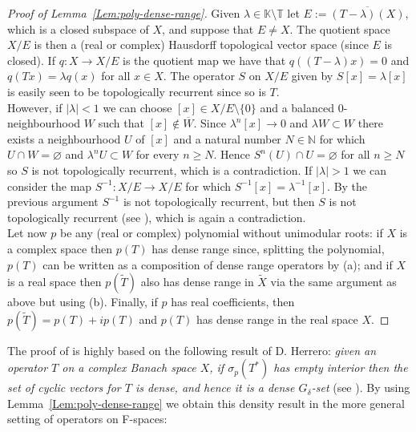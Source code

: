 \documentclass[openright,11pt]{article}
\theoremstyle{plain}
\theoremstyle{definition}
\newcommand{\NN}{\mathbb{N}}
\newcommand{\KK}{\mathbb{K}}
\newcommand{\TT}{\mathbb{T}}
\newcommand{\cl}{\overline}
\newcommand{\til}{\widetilde} %
\begin{document}
\begin{proof}[Proof of Lemma~\ref{Lem:poly-dense-range}]
	Given $\lambda \in \KK\setminus\TT$ let $E:=\cl{(T-\lambda)(X)}$, which is a closed subspace of $X$, and suppose that $E\neq X$. The quotient space $X/E$ is then a (real or complex) Hausdorff topological vector space (since $E$ is closed). If $q:X\longrightarrow X/E$ is the quotient map we have that $q((T-\lambda)x)=0$ and $q(Tx) = \lambda q(x)$ for all $x\in X$. The operator $S$ on $X/E$ given by $S[x] = \lambda[x]$ is easily seen to be topologically recurrent since so is $T$.\\[-5pt]
	
	However, if $|\lambda|<1$ we can choose $[x] \in X/E\setminus\{0\}$ and a balanced $0$-neighbourhood $W$ such that $[x] \notin \cl{W}$. Since $\lambda^n[x] \to 0$ and $\lambda W \subset W$ there exists a neighbourhood $U$ of $[x]$ and a natural number $N \in \NN$ for which $U\cap W=\varnothing$ and $\lambda^nU \subset W$ for every $n\geq N$. Hence $S^n(U) \cap U = \varnothing$ for all $n\geq N$ so $S$ is not topologically recurrent, which is a contradiction. If $|\lambda|>1$ we can consider the map $S^{-1}:X/E\longrightarrow X/E$ for which $S^{-1}[x]=\lambda^{-1}[x]$. By the previous argument $S^{-1}$ is not topologically recurrent, but then $S$ is not topologically recurrent (see \cite[Section 6]{GriLo2023}), which is again a contradiction.\\[-5pt]
	
	Let now $p$ be any (real or complex) polynomial without unimodular roots: if $X$ is a complex space then $p(T)$ has dense range since, splitting the polynomial, $p(T)$ can be written as a composition of dense range operators by (a); and if $X$ is a real space then $p(\til{T})$ also has dense range in $\til{X}$ via the same argument as above but using (b). Finally, if $p$ has real coefficients, then $p(\til{T})=p(T)+ip(T)$ and $p(T)$ has dense range in the real space $X$.
\end{proof}

The proof of \cite[Corollary 9.2]{CoMaPa2014} is highly based on the following result of D. Herrero: {\em given an operator $T$ on a complex Banach space $X$, if $\sigma_p(T^*)$ has empty interior then the set of cyclic vectors for $T$ is dense, and hence it is a dense $G_{\delta}$-set} (see \cite{Herrero1979}). By using Lemma~\ref{Lem:poly-dense-range} we obtain this density result in the more general setting of operators on F-spaces:
\end{document}
